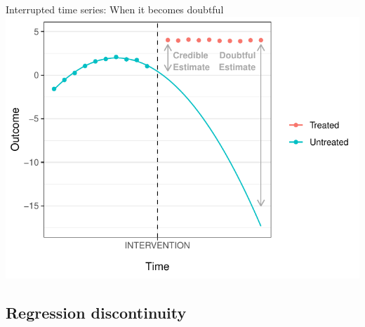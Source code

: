 \documentclass{beamer}
\begin{document}
\begin{frame}[t]{Interrupted time series: When it becomes doubtful}
\includegraphics[width = \textwidth]{figures/its_problem_5}
\end{frame}

\subsection{Regression discontinuity}
\end{document}
